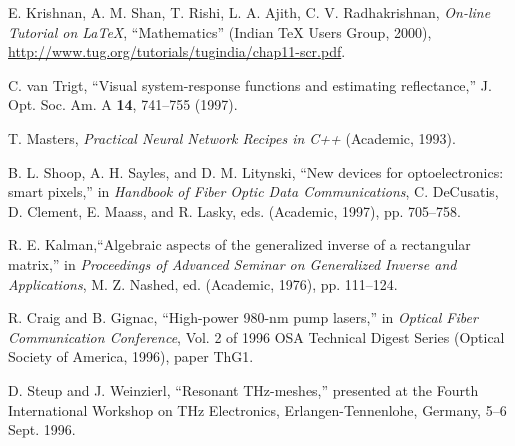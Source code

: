 \documentclass[letterpaper,10pt]{article}
\begin{document}
\begin{thebibliography}{99} %



 E. Krishnan, A. M. Shan, T. Rishi, L. A. Ajith, C. V.
Radhakrishnan, \textit{On-line Tutorial on \LaTeX{}},
``Mathematics'' (Indian \TeX{} Users Group, 2000), \\
\url{http://www.tug.org/tutorials/tugindia/chap11-scr.pdf}.

 C. van Trigt, ``Visual system-response functions and estimating reflectance,''
J. Opt. Soc. Am. A \textbf{14}, 741--755 (1997).

 T. Masters, \emph{Practical Neural Network Recipes in C++} (Academic, 1993).

 B. L. Shoop, A. H. Sayles, and D. M. Litynski, ``New devices for optoelectronics: smart pixels,''
in \emph{Handbook of Fiber Optic Data Communications},
C. DeCusatis, D. Clement, E. Maass, and R. Lasky, eds. (Academic, 1997), pp. 705--758.

 R. E. Kalman,``Algebraic aspects of the generalized inverse of a rectangular matrix,'' in
\emph{Proceedings of Advanced Seminar on Generalized Inverse and Applications}, M. Z. Nashed, ed. (Academic, 1976), pp. 111--124.

 R. Craig and B. Gignac, ``High-power 980-nm pump lasers,''
in \emph{Optical Fiber Communication Conference}, Vol. 2 of 1996 OSA Technical Digest Series (Optical Society of America, 1996), paper ThG1.

 D. Steup and J. Weinzierl, ``Resonant THz-meshes,''
presented at the Fourth International Workshop on THz Electronics, Erlangen-Tennenlohe, Germany, 5--6 Sept. 1996.

\end{thebibliography}
\end{document}
